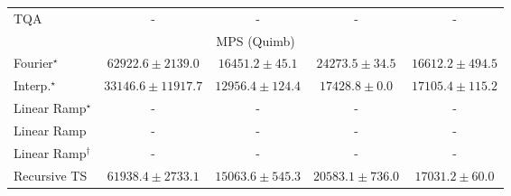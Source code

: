 \begin{tabular}{l|cccc|}
TQA & {\cellcolor[HTML]{000000}} \color[HTML]{F1F1F1} {\cellcolor{white}} \color{black} - & {\cellcolor[HTML]{000000}} \color[HTML]{F1F1F1} {\cellcolor{white}} \color{black} - & {\cellcolor[HTML]{000000}} \color[HTML]{F1F1F1} {\cellcolor{white}} \color{black} - & {\cellcolor[HTML]{000000}} \color[HTML]{F1F1F1} {\cellcolor{white}} \color{black} - \\
\cline{1-5}
\multicolumn{5}{c}{\rule{0pt}{8pt}MPS (Quimb)} \\
\midrule
Fourier$^\star$ & {\cellcolor[HTML]{9E3604}} \color[HTML]{F1F1F1} $62922.6\pm 2139.0$ & {\cellcolor[HTML]{FFFBD2}} \color[HTML]{000000} $16451.2\pm 45.1$ & {\cellcolor[HTML]{FEECA4}} \color[HTML]{000000} $24273.5\pm 34.5$ & {\cellcolor[HTML]{FFFBD0}} \color[HTML]{000000} $16612.2\pm 494.5$ \\
Interp.$^\star$ & {\cellcolor[HTML]{FECA5D}} \color[HTML]{000000} $33146.6\pm 11917.7$ & {\cellcolor[HTML]{FFFFE5}} \color[HTML]{000000} $12956.4\pm 124.4$ & {\cellcolor[HTML]{FFFACD}} \color[HTML]{000000} $17428.8\pm 0.0$ & {\cellcolor[HTML]{FFFACE}} \color[HTML]{000000} $17105.4\pm 115.2$ \\
Linear Ramp$^\star$ & {\cellcolor[HTML]{000000}} \color[HTML]{F1F1F1} {\cellcolor{white}} \color{black} - & {\cellcolor[HTML]{000000}} \color[HTML]{F1F1F1} {\cellcolor{white}} \color{black} - & {\cellcolor[HTML]{000000}} \color[HTML]{F1F1F1} {\cellcolor{white}} \color{black} - & {\cellcolor[HTML]{000000}} \color[HTML]{F1F1F1} {\cellcolor{white}} \color{black} - \\
Linear Ramp & {\cellcolor[HTML]{000000}} \color[HTML]{F1F1F1} {\cellcolor{white}} \color{black} - & {\cellcolor[HTML]{000000}} \color[HTML]{F1F1F1} {\cellcolor{white}} \color{black} - & {\cellcolor[HTML]{000000}} \color[HTML]{F1F1F1} {\cellcolor{white}} \color{black} - & {\cellcolor[HTML]{000000}} \color[HTML]{F1F1F1} {\cellcolor{white}} \color{black} - \\
Linear Ramp$^\dagger$ & {\cellcolor[HTML]{000000}} \color[HTML]{F1F1F1} {\cellcolor{white}} \color{black} - & {\cellcolor[HTML]{000000}} \color[HTML]{F1F1F1} {\cellcolor{white}} \color{black} - & {\cellcolor[HTML]{000000}} \color[HTML]{F1F1F1} {\cellcolor{white}} \color{black} - & {\cellcolor[HTML]{000000}} \color[HTML]{F1F1F1} {\cellcolor{white}} \color{black} - \\
Recursive TS & {\cellcolor[HTML]{A43904}} \color[HTML]{F1F1F1} $61938.4\pm 2733.1$ & {\cellcolor[HTML]{FFFDD9}} \color[HTML]{000000} $15063.6\pm 545.3$ & {\cellcolor[HTML]{FFF6BA}} \color[HTML]{000000} $20583.1\pm 736.0$ & {\cellcolor[HTML]{FFFACE}} \color[HTML]{000000} $17031.2\pm 60.0$ \\

\end{tabular}
